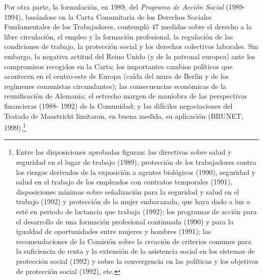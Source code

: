 \documentclass[10pt,a4paper]{article}
\begin{document}
Por otra parte, la formulación, en 1989, del \textit{Programa de Acción Social} (1989-1994), basándose en la Carta Comunitaria de los Derechos Sociales Fundamentales de los Trabajadores, contempló $47$ medidas sobre el derecho a la libre circulación, el empleo y la formación profesional, la regulación de las condiciones de trabajo, la protección social y los derechos colectivos laborales. Sin embargo, la negativa actitud del Reino Unido (y de la patronal europea) ante los compromisos recogidos en la Carta; los importantes cambios políticos que acontecen en el centro-este de Europa (caída del muro de Berlín y de los regímenes comunistas circundantes); las consecuencias económicas de la reunificación de Alemania; el estrecho margen de maniobra de las perspectivas financieras (1988- 1992) de la Comunidad; y las difíciles negociaciones del Tratado de Maastricht limitaron, en buena medida, su aplicación (BRUNET, 1999).\footnote{%
    Entre las disposiciones aprobadas figuran: las directivas sobre salud y seguridad en el lugar de trabajo (1989), protección de los trabajadores contra los riesgos derivados de la exposición a agentes biológicos (1990), seguridad y salud en el trabajo de los empleados con contratos temporales (1991), disposiciones mínimas sobre señalización para la seguridad y salud en el trabajo (1992) y protección de la mujer embarazada, que haya dado a luz o esté en periodo de lactancia que trabaja (1992); los programas de acción para el desarrollo de una formación profesional continuada (1990) y para la igualdad de oportunidades entre mujeres y hombres (1991); las recomendaciones de la Comisión sobre la creación de criterios comunes para la suficiencia de renta y la extensión de la asistencia social en los sistemas de protección social (1992) y sobre la convergencia en las políticas y los objetivos de protección social (1992), etc.
}
\end{document}

